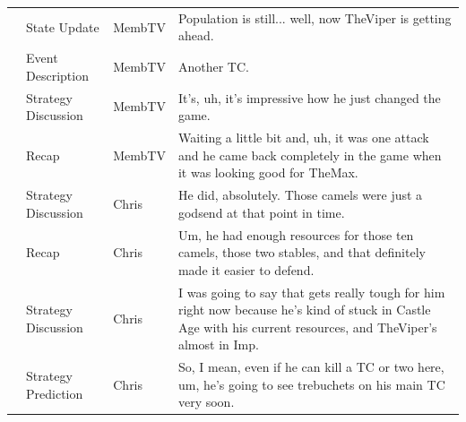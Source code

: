 {\begin{longtable}{@{}>{\theAppRow}r|L{2.3cm}L{1.0cm}U{11.55cm}@{}}
    & State Update          & MembTV       & Population is still... well, now TheViper is getting ahead.                                                                                                                                                                                                      \\
    & Event Description     & MembTV       & Another TC.                                                                                                                                                                                                                                                      \\
    & Strategy Discussion   & MembTV       & It's, uh, it's impressive how he just changed the game.                                                                                                                                                                                                          \\
    & Recap                 & MembTV       & Waiting a little bit and, uh, it was one attack and he came back completely in the game when it was looking good for TheMax.                                                                                                                                     \\
    & Strategy Discussion      & Chris        & He did, absolutely. Those camels were just a godsend at that point in time.                                                                                                                                                                                      \\
    & Recap                 & Chris        & Um, he had enough resources for those ten camels, those two stables, and that definitely made it easier to defend.                                                                                                                                               \\
    & Strategy Discussion      & Chris        & I was going to say that gets really tough for him right now because he's kind of stuck in Castle Age with his current resources, and TheViper's almost in Imp.                                                                                                   \\
    & Strategy Prediction   & Chris        & So, I mean, even if he can kill a TC or two here, um, he's going to see trebuchets on his main TC very soon.                                                                                                                                                     \\

\end{longtable}}
